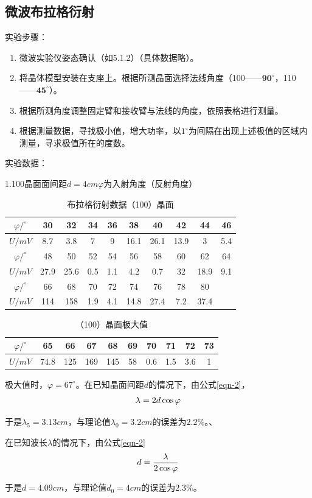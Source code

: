 \documentclass[11pt]{article}
\begin{document}
\subsection{微波布拉格衍射}
\noindent 实验步骤：
\begin{enumerate}
    \item 微波实验仪姿态确认（如5.1.2）（具体数据略）。
    \item 将晶体模型安装在支座上。根据所测晶面选择法线角度（100——$\mathbf{90^\circ}$，110——$\mathbf{45^\circ}$）。
    \item 根据所测角度调整固定臂和接收臂与法线的角度，依照表格进行测量。
    \item 根据测量数据，寻找极小值，增大功率，以$1^\circ$为间隔在出现上述极值的区域内测量，寻求极值所在的度数。
\end{enumerate}
\noindent 实验数据：
\par
1.100晶面\qquad 面间距$d=4cm$\qquad $\varphi$为入射角度（反射角度）
\begin{table}[H]
    \centering
    \caption{布拉格衍射数据（100）晶面}
    \begin{tabular}{|c|c|c|c|c|c|c|c|c|c|}
    \hline
        $\varphi /^\circ$ & 30 & 32 & 34 & 36 & 38 & 40 & 42 & 44 & 46 \\ \hline
        $U/mV$ & 8.7 & 3.8 & 7 & 9 & 16.1 & 26.1 & 13.9 & 3 & 5.4 \\ \hline
        $\varphi /^\circ$ & 48 & 50 & 52 & 54 & 56 & 58 & 60 & 62 & 64 \\ \hline
        $U/mV$ & 27.9 & 25.6 & 0.5 & 1.1 & 4.2 & 0.7 & 32 & 18.9 & 9.1 \\ \hline
        $\varphi /^\circ$ & 66 & 68 & 70 & 72 & 74 & 76 & 78 & 80 & ~ \\ \hline
        $U/mV$ & 114 & 158 & 1.9 & 4.1 & 14.8 & 27.4 & 7.2 & 37.4 & ~\\ \hline
    \end{tabular}
\end{table}
\begin{table}[H]
    \centering
    \caption{（100）晶面极大值}
    \begin{tabular}{|c|c|c|c|c|c|c|c|c|c|}
    \hline
        $\varphi /^\circ$ & 65 & 66 & 67 & 68 & 69 & 70 & 71 & 72 & 73 \\ \hline
        $U/mV$ & 74.8 & 125 & 169 & 145 & 58 & 0.6 & 1.5 & 3.6 & 1 \\ \hline
    \end{tabular}
\end{table}
\par 极大值时，$\varphi=67^\circ$。在已知晶面间距$d$的情况下，由公式\eqref{eqn-2}，
\begin{equation}{\label{eqn-10}}
    \lambda=2d\cos\varphi
\end{equation}
\par 于是$\lambda_5=3.13cm$，与理论值$\lambda_0=3.2cm$的误差为$2.2\%$。、
\par 在已知波长$\lambda$的情况下，由公式\eqref{eqn-2}
\begin{equation}{\label{eqn-11}}
    d=\frac{\lambda}{2\cos \varphi} 
\end{equation}
\par 于是$d=4.09cm$，与理论值$d_0=4cm$的误差为$2.3\%$。
\end{document}
